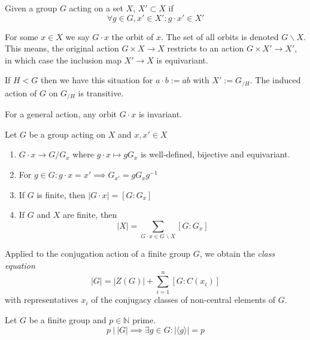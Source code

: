 \begin{definition}
   Given a group \(G\) acting on a set \(X\), \(X' \subset X\) if
   \[\forall g \in G, x' \in X': g \cdot x' \in X'\]
\end{definition}
\begin{remark}
   For some \(x \in X\) we say \(G \cdot x\) the orbit of \(x\).
   The set of all orbits is denoted \(G\backslash X\).
   This means, the original action \(G \times X \to X\) restricts to an action \(G \times X' \to X'\), in which case the inclusion map \(X' \to X\) is equivariant.
\end{remark}
\begin{example}
   If \(H < G\) then we have this situation for \(a \cdot b := ab\) with \(X' := G_{/H}\).
   The induced action of \(G\) on \(G_{/H}\) is transitive.

   For a general action, any orbit \(G \cdot x\) is invariant.
\end{example}

\begin{proposition}
   Let \(G\) be a group acting on \(X\) and \(x, x' \in X\)
   \begin{enumerate}[label=\roman*, align=Center]
      \item \(G \cdot x \to G/G_x\) where \(g \cdot x \mapsto gG_x\) is well-defined, bijective and equivariant.
      \item For \(g \in G: g \cdot x = x' \implies G_{x'} = gG_xg^{-1}\)
      \item If \(G\) is finite, then \(|G \cdot x| = [G : G_x]\)
      \item If \(G\) and \(X\) are finite, then
         \[|X| = \sum_{G \cdot x \in G \backslash X} [G : G_x]\]
   \end{enumerate}
\end{proposition}
\begin{remark}
   Applied to the conjugation action of a finite group \(G\), we obtain the \emph{class equation}
   \[|G| = |Z(G)| + \sum_{i=1}^n [G : C(x_i)]\]
   with representatives \(x_i\) of the conjugacy classes of non-central elements of \(G\).
\end{remark}

\begin{proposition}
   Let \(G\) be a finite group and \(p \in \mathbb{N}\) prime.
   \[p~|~|G| \implies \exists g \in G: |\langle g\rangle| = p\]
\end{proposition}

